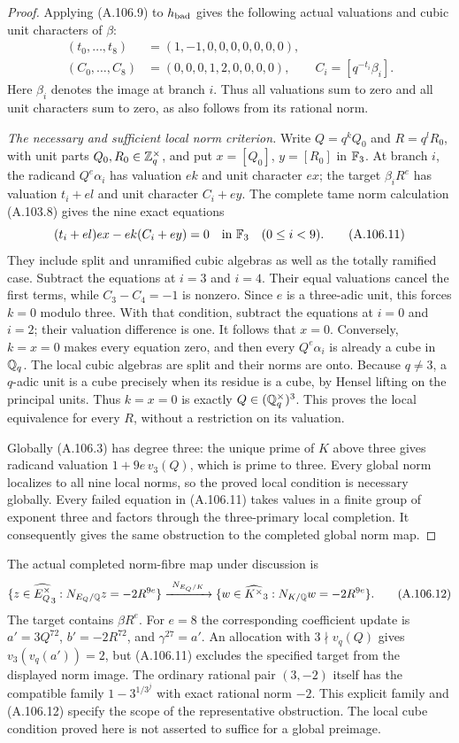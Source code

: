 \begin{proof}
Applying (A.106.9) to $h_{\rm bad}$ gives the following
actual valuations and cubic unit characters of $\beta$:
\[
 \begin{split}
 (t_0,\ldots,t_8)&=(1,-1,0,0,0,0,0,0,0),\\
 (C_0,\ldots,C_8)&=(0,0,0,1,2,0,0,0,0),
       \qquad C_i=[q^{-t_i}\beta_i].
 \end{split}
 \tag{A.106.10}
\]
Here $\beta_i$ denotes the image at branch $i$.
Thus all valuations sum to zero and all unit characters
sum to zero, as also follows from its rational norm.

\emph{The necessary and sufficient local norm criterion.}
Write $Q=q^kQ_0$ and $R=q^lR_0$, with unit parts
$Q_0,R_0\in\mathbb Z_q^\times$, and put
$x=[Q_0]$, $y=[R_0]$ in $\mathbb F_3$.
At branch $i$, the radicand $Q^e\alpha_i$ has
valuation $ek$ and unit character $ex$; the target
$\beta_iR^e$ has valuation $t_i+el$ and unit character
$C_i+ey$.
The complete tame norm calculation (A.103.8) gives
the nine exact equations
\[
            (t_i+el)ex-ek(C_i+ey)=0
                         \quad\hbox{in }\mathbb F_3\quad(0\le i<9).
 \tag{A.106.11}
\]
They include split and unramified cubic algebras as
well as the totally ramified case.
Subtract the equations at $i=3$ and $i=4$.
Their equal valuations cancel the first terms, while
$C_3-C_4=-1$ is nonzero.
Since $e$ is a three-adic unit, this forces
$k=0$ modulo three.
With that condition, subtract the equations at $i=0$
and $i=2$; their valuation difference is one.
It follows that $x=0$.
Conversely, $k=x=0$ makes every equation zero, and
then every $Q^e\alpha_i$ is already a cube in $\mathbb Q_q$.
The local cubic algebras are split and their norms
are onto.
Because $q\ne3$, a $q$-adic unit is a cube precisely
when its residue is a cube, by Hensel lifting on the
principal units.
Thus $k=x=0$ is exactly $Q\in(\mathbb Q_q^\times)^3$.
This proves the local equivalence for every $R$,
without a restriction on its valuation.

Globally (A.106.3) has degree three: the unique
prime of $K$ above three gives radicand valuation
$1+9e\,v_3(Q)$, which is prime to three.
Every global norm localizes to all nine local norms,
so the proved local condition is necessary globally.
Every failed equation in (A.106.11) takes values
in a finite group of exponent three and factors
through the three-primary local completion.
It consequently gives the same obstruction to the
completed global norm map.
\end{proof}

The actual completed norm-fibre map under discussion is
\[
 \{z\in\widehat{E_Q^\times}_3:
          N_{E_Q/\mathbb Q}z=-2R^{9e}\}
       \xrightarrow{\ N_{E_Q/K}\ }
 \{w\in\widehat{K^\times}_3:
          N_{K/\mathbb Q}w=-2R^{9e}\}.
 \tag{A.106.12}
\]
The target contains $\beta R^e$.
For $e=8$ the corresponding coefficient update is
$a'=3Q^{72}$, $b'=-2R^{72}$, and
$\gamma^{27}=a'$.
An allocation with $3\nmid v_q(Q)$ gives
$v_3(v_q(a'))=2$, but (A.106.11) excludes the
specified target from the displayed norm image.
The ordinary rational pair $(3,-2)$ itself has the
compatible family $1-3^{1/3^j}$ with exact rational
norm $-2$.
This explicit family and (A.106.12) specify the
scope of the representative obstruction.
The local cube condition proved here is not asserted
to suffice for a global preimage.

